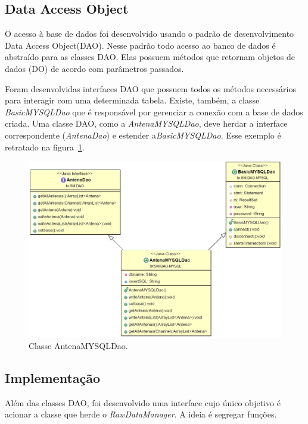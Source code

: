 \subsection{ Data Access Object}

O acesso à base de dados foi desenvolvido usando o padrão de desenvolvimento Data Access Object(DAO).
Nesse padrão todo acesso ao banco de dados é abstraído para as classes DAO. Elas possuem métodos que retornam objetos de dados (DO) de acordo com parâmetros passados. 

Foram desenvolvidas interfaces DAO que possuem todos os métodos necessários para interagir com uma determinada tabela.  Existe, também, a classe \textit{BasicMYSQLDao} que é responsável por gerenciar a conexão com a base de dados criada. Uma classe DAO, como a \textit{AntenaMYSQLDao}, deve herdar a interface correspondente (\textit{AntenaDao}) e estender a\textit{BasicMYSQLDao}. Esse exemplo é retratado na figura~\ref{fig:antenadao}.

\begin{figure}[htb]
\centering
\includegraphics[width=1.0\textwidth]{figs/dao}
\caption[Exemplo da classe \textit{AntenaMYSQLDao}.]
{Classe AntenaMYSQLDao.}
\label{fig:antenadao}
\end{figure}


\subsection{Implementação}

Além das classes DAO, foi desenvolvido uma interface cujo único objetivo é acionar a classe que herde o \textit{RawDataManager}. A ideia é segregar funções.

